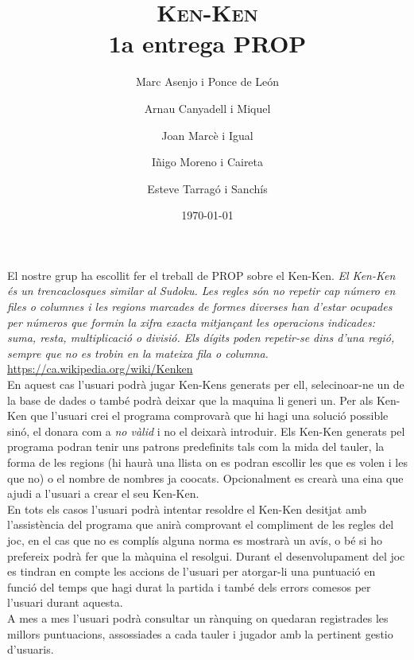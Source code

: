 \documentclass[a4paper,12pt]{article}
\begin{document}
\title{\textsc{Ken-Ken} \\ \large 1a entrega PROP}
\author{Marc Asenjo i Ponce de León \and
	Arnau Canyadell i Miquel \and
	Joan Marcè i Igual \and
	Iñigo Moreno i Caireta \and
	Esteve Tarragó i Sanchís}

\date{\today}
\maketitle

El nostre grup ha escollit fer el treball de PROP sobre el Ken-Ken.
\textit{El Ken-Ken és un trencaclosques similar al Sudoku.
 Les regles són no repetir cap número en files o columnes i les regions marcades de formes diverses han 
 d'estar ocupades per números que formin la xifra exacta mitjançant les operacions indicades: suma, 
 resta, multiplicació o divisió. Els dígits poden repetir-se dins d'una regió, sempre que no es trobin 
 en la mateixa fila o columna.} \\ 
\href{https://ca.wikipedia.org/wiki/Kenken}{https://ca.wikipedia.org/wiki/Kenken}
\\


En aquest cas l'usuari podrà jugar Ken-Kens generats per ell, selecinoar-ne un de la base de dades o també podrà
deixar que la maquina li generi un. 
Per als Ken-Ken que l'usuari crei el programa comprovarà que hi hagi una solució
possible sinó, el donara com a \emph{no vàlid} i no el deixarà introduir. Els Ken-Ken generats 
pel programa podran tenir uns patrons predefinits tals com la mida del tauler, la forma de les 
regions (hi haurà una llista on es podran escollir les que es volen i les que no) o el nombre 
de nombres ja co\lgem ocats. Opcionalment es crearà una eina que ajudi a l'usuari a crear el seu Ken-Ken.
\\


En tots els casos l'usuari podrà intentar resoldre el Ken-Ken desitjat amb
l'assistència del programa que anirà comprovant el compliment de les regles del
joc, en el cas que no es complís alguna norma es mostrarà un avís, o bé si ho prefereix podrà fer que la màquina el resolgui. Durant el
desenvolupament del joc es tindran en compte les accions de l'usuari per
atorgar-li una puntuació en funció del temps que hagi durat la partida
i també dels errors comesos per l'usuari durant aquesta.
\\


A mes a mes l'usuari podrà consultar un rànquing on quedaran registrades les millors puntuacions,
assossiades a cada tauler i jugador amb la pertinent gestio d'usuaris.
\end{document}
